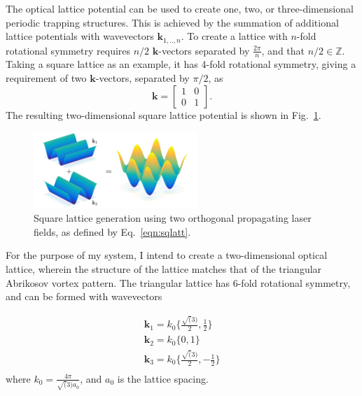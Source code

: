 {The optical lattice potential can be used to create one, two, or three-dimensional periodic trapping structures. This is achieved by the summation of additional lattice potentials with wavevectors $\mathbf{k}_{1,..,n}$. To create a lattice with $n$-fold rotational symmetry requires $n/2$ $\mathbf{k}$-vectors separated by $\frac{2\pi}{n}$, and that $n/2 \in \mathbb{Z}$. Taking a square lattice as an example, it has 4-fold rotational symmetry, giving a requirement of two $\mathbf{k}$-vectors, separated by $\pi/2$, as
\begin{equation}
    \mathbf{k} =
    \begin{bmatrix}
     1 & 0 \\
     0 & 1
    \end{bmatrix}.\label{eqn:sqlatt}
\end{equation}
The resulting two-dimensional square lattice potential is shown in Fig.~\ref{fig:cos2xy}.
\begin{figure}[tb]\centering
    \includegraphics[width=0.55\textwidth]{./Images/ch4_vtx/VOPT/squarelatt}
    \caption{Square lattice generation using two orthogonal propagating laser fields, as defined by Eq.~\ref{eqn:sqlatt}.}\label{fig:cos2xy}
\end{figure}

For the purpose of my system, I intend to create a two-dimensional optical lattice, wherein the structure of the lattice matches that of the triangular Abrikosov vortex pattern. The triangular lattice has 6-fold rotational symmetry, and can be formed with wavevectors

\begin{subequations}
    \begin{align}
        \mathbf{k}_1 = k_0\{\frac{\sqrt(3)}{2},\frac{1}{2}\} \\
        \mathbf{k}_2 = k_0\{0,1\} \\
        \mathbf{k}_3 = k_0\{\frac{\sqrt(3)}{2},-\frac{1}{2}\} \\
    \end{align}
\end{subequations}
where $k_0 = \frac{4\pi}{\sqrt(3)a_0}$, and $a_0$ is the lattice spacing.


}
